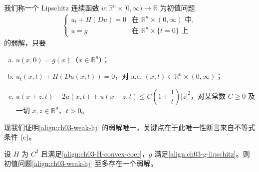 \documentclass[../../main.tex]{subfiles}
\begin{document}
\begin{definition}\label{definition:ch03-weak-hj}
我们称一个 Lipschitz 连续函数 $u:\mathbb{R}^n\times[0,\infty)\to\mathbb{R}$ 为初值问题
\begin{align}\label{align:ch03-weak-hj}
\begin{cases}
u_t+H(Du)=0 & \text{在 }\mathbb{R}^n\times(0,\infty)\text{ 中},\\
u=g & \text{在 }\mathbb{R}^n\times\{t=0\}\text{ 上}
\end{cases}
\end{align}
的弱解，只要
\begin{enumerate}[(a)]
\item $u(x,0)=g(x)$（$x\in\mathbb{R}^n$）；
\item $u_t(x,t)+H(Du(x,t))=0$，对 a.e. $(x,t)\in\mathbb{R}^n\times(0,\infty)$；
\item $u(x+z,t)-2u(x,t)+u(x-z,t)\leqslant C\left(1+\dfrac{1}{t}\right)|z|^2$，对某常数 $C\geqslant 0$ 及一切 $x,z\in\mathbb{R}^n$、$t>0$。
\end{enumerate}
\end{definition}

现我们证明\eqref{align:ch03-weak-hj} 的弱解唯一，关键点在于此唯一性断言来自不等式条件 (c)。

\begin{theorem}[弱解的唯一性]\label{theorem:ch03-weak-uniqueness}设 $H$ 为 $C^2$ 且满足\eqref{align:ch03-H-convex-coer}，$g$ 满足\eqref{align:ch03-g-lipschitz}。则初值问题\eqref{align:ch03-weak-hj} 至多存在一个弱解。
\end{theorem}
\end{document}
